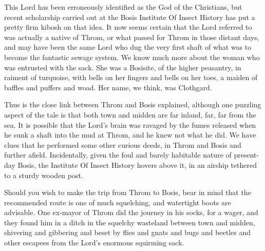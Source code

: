 This Lord has been erroneously identified as the God of the Christians, but recent scholarship carried out at the Bosis Institute Of Insect History has put a pretty firm kibosh on that idea. It now seems certain that the Lord referred to was actually a native of Throm, or what passed for Throm in those distant days, and may have been the same Lord who dug the very first shaft of what was to become the fantastic sewage system. We know much more about the woman who was entrusted with the sack. She was a Bosisite, of the higher peasantry, in raiment of turquoise, with bells on her fingers and bells on her toes, a maiden of baffles and puffers and woad. Her name, we think, was Clothgard.

Thus is the close link between Throm and Bosis explained, although one puzzling aspect of the tale is that both town and midden are far inland, far, far from the sea. It is possible that the Lord's brain was ravaged by the fumes released when he sunk a shaft into the mud at Throm, and he knew not what he did. We have clues that he performed some other curious deeds, in Throm and Bosis and further afield. Incidentally, given the foul and barely habitable nature of present-day Bosis, the Institute Of Insect History hovers above it, in an airship tethered to a sturdy wooden post.

Should you wish to make the trip from Throm to Bosis, bear in mind that the recommended route is one of much squelching, and watertight boots are advisable. One ex-mayor of Throm did the journey in his socks, for a wager, and they found him in a ditch in the squelchy wasteland between town and midden, shivering and gibbering and beset by flies and gnats and bugs and beetles and other escapees from the Lord's enormous squirming sack.